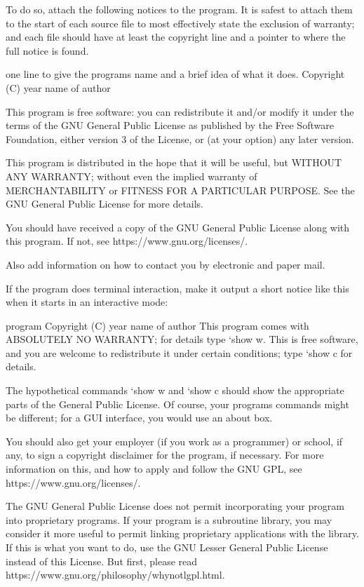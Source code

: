 \documentclass[letterpaper,10pt,english]{sphinxmanual}
\begin{document}
\begin{sphinxVerbatim}[commandchars=\\\{\}]
  To do so, attach the following notices to the program.  It is safest
to attach them to the start of each source file to most effectively
state the exclusion of warranty; and each file should have at least
the \PYGZdq{}copyright\PYGZdq{} line and a pointer to where the full notice is found.

    \PYGZlt{}one line to give the program\PYGZsq{}s name and a brief idea of what it does.\PYGZgt{}
    Copyright (C) \PYGZlt{}year\PYGZgt{}  \PYGZlt{}name of author\PYGZgt{}

    This program is free software: you can redistribute it and/or modify
    it under the terms of the GNU General Public License as published by
    the Free Software Foundation, either version 3 of the License, or
    (at your option) any later version.

    This program is distributed in the hope that it will be useful,
    but WITHOUT ANY WARRANTY; without even the implied warranty of
    MERCHANTABILITY or FITNESS FOR A PARTICULAR PURPOSE.  See the
    GNU General Public License for more details.

    You should have received a copy of the GNU General Public License
    along with this program.  If not, see \PYGZlt{}https://www.gnu.org/licenses/\PYGZgt{}.

Also add information on how to contact you by electronic and paper mail.

  If the program does terminal interaction, make it output a short
notice like this when it starts in an interactive mode:

    \PYGZlt{}program\PYGZgt{}  Copyright (C) \PYGZlt{}year\PYGZgt{}  \PYGZlt{}name of author\PYGZgt{}
    This program comes with ABSOLUTELY NO WARRANTY; for details type `show w\PYGZsq{}.
    This is free software, and you are welcome to redistribute it
    under certain conditions; type `show c\PYGZsq{} for details.

The hypothetical commands `show w\PYGZsq{} and `show c\PYGZsq{} should show the appropriate
parts of the General Public License.  Of course, your program\PYGZsq{}s commands
might be different; for a GUI interface, you would use an \PYGZdq{}about box\PYGZdq{}.

  You should also get your employer (if you work as a programmer) or school,
if any, to sign a \PYGZdq{}copyright disclaimer\PYGZdq{} for the program, if necessary.
For more information on this, and how to apply and follow the GNU GPL, see
\PYGZlt{}https://www.gnu.org/licenses/\PYGZgt{}.

  The GNU General Public License does not permit incorporating your program
into proprietary programs.  If your program is a subroutine library, you
may consider it more useful to permit linking proprietary applications with
the library.  If this is what you want to do, use the GNU Lesser General
Public License instead of this License.  But first, please read
\PYGZlt{}https://www.gnu.org/philosophy/why\PYGZhy{}not\PYGZhy{}lgpl.html\PYGZgt{}.
\end{sphinxVerbatim}
\end{document}
